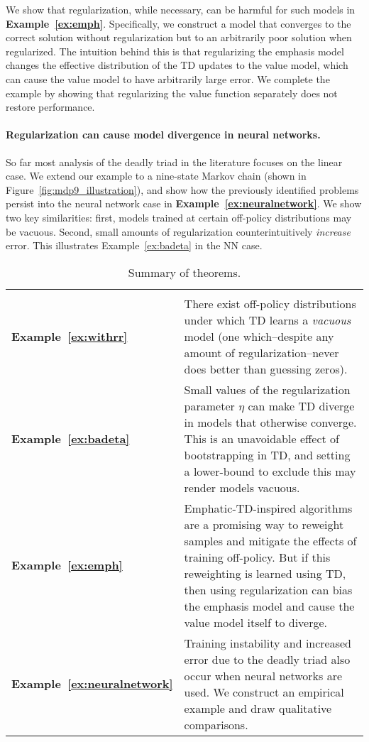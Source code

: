 We show that regularization, while necessary, can be harmful for such models in \textbf{Example~\ref{ex:emph}}. Specifically, we construct a model that converges to the correct solution without regularization but to an arbitrarily poor solution when regularized. The intuition behind this is that regularizing the emphasis model changes the effective distribution of the TD updates to the value model, which can cause the value model to have arbitrarily large error. We complete the example by showing that regularizing the value function separately does not restore performance.

\paragraph{Regularization can cause model divergence in neural networks. }
So far most analysis of the deadly triad in the literature focuses on the linear case. We extend our example to a nine-state Markov chain (shown in Figure~\ref{fig:mdp9_illustration}), and show how the previously identified problems persist into the neural network case in \textbf{Example~\ref{ex:neuralnetwork}}. We show two key similarities: first, models trained at certain off-policy distributions may be vacuous. Second, small amounts of regularization counterintuitively \emph{increase} error. This illustrates Example~\ref{ex:badeta} in the NN case.

\begin{table}
  \centering
  \begin{tabular}{p{} p{}}
    \toprule\toprule
    \\  \textbf{Example~\ref{ex:withrr}} & There exist off-policy distributions under which TD learns a \emph{vacuous} model (one which--despite any amount of regularization--never does better than guessing zeros).
    \\  \textbf{Example~\ref{ex:badeta}} & Small values of the regularization parameter $\eta$ can make TD diverge in models that otherwise converge. This is an unavoidable effect of bootstrapping in TD, and setting a lower-bound to exclude this may render models vacuous.
    \\  \textbf{Example~\ref{ex:emph}} & Emphatic-TD-inspired algorithms are a promising way to reweight samples and mitigate the effects of training off-policy. But if this reweighting is learned using TD, then using regularization can bias the emphasis model and cause the value model itself to diverge.
    \\  \textbf{Example~\ref{ex:neuralnetwork}} & Training instability and increased error due to the deadly triad also occur when neural networks are used. We construct an empirical example and draw qualitative comparisons.
    \\ \bottomrule \bottomrule
  \end{tabular}
  \vspace{7pt}
  \caption{Summary of theorems. }
  \label{tab:summarytheorems}
\end{table}


